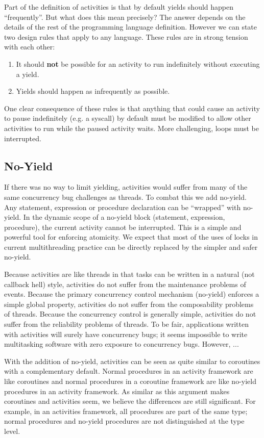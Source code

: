 \documentclass[10pt,preprint]{sigplanconf}
\begin{document}
Part of the definition of activities is that by default yields should happen ``frequently''.
But what does this mean precisely?
The answer depends on the details of the rest of the programming language definition.
However we can state two design rules that apply to any language.
These rules are in strong tension with each other:

\begin{enumerate}
\item It should \textbf{not} be possible for an activity to run indefinitely without executing a yield.
\item Yields should happen as infrequently as possible.
\end{enumerate}

One clear consequence of these rules is that anything that could cause an activity to pause indefinitely (e.g. a syscall) by default must be modified to allow other activities to run while the paused activity waits.
More challenging, loops must be interrupted.

\subsection{No-Yield}

If there was no way to limit yielding, activities would suffer from many of the same concurrency bug challenges as threads.
To combat this we add no-yield.
Any statement, expression or procedure declaration can be ``wrapped'' with no-yield.
In the dynamic scope of a no-yield block (statement, expression, procedure), the current activity cannot be interrupted.
This is a simple and powerful tool for enforcing atomicity.
We expect that most of the uses of locks in current multithreading practice can be directly replaced by the simpler and safer no-yield.

Because activities are like threads in that tasks can be written in a natural (not callback hell) style, activities do not suffer from the maintenance problems of events.
Because the primary concurrency control mechanism (no-yield) enforces a simple global property, activities do not suffer from the composability problems of threads.
Because the concurrency control is generally simple, activities do not suffer from the reliability problems of threads.
To be fair, applications written with activities will surely have concurrency bugs; it seems impossible to write multitasking software with zero exposure to concurrency bugs.
However, ...

With the addition of no-yield, activities can be seen as quite similar to coroutines with a complementary default.
Normal procedures in an activity framework are like coroutines and normal procedures in a coroutine framework are like no-yield procedures in an activity framework.
As similar as this argument makes coroutines and activities seem, we believe the differences are still significant.
For example, in an activities framework, all procedures are part of the same type; normal procedures and no-yield procedures are not distinguished at the type level.
\end{document}

